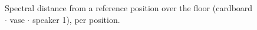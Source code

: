 \begin{figure}[t]
\centering

\caption{Spectral distance from a reference position over the floor (cardboard $\cdot$ vase $\cdot$ speaker 1), per position.}
\label{fig:spectral_distance_vase_photo}
\end{figure}
